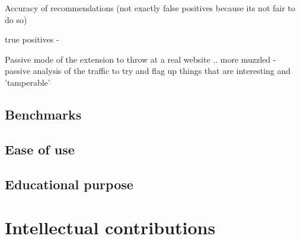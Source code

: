 Accuracy of recommendations (not exactly false positives because its not fair to do so)

true positives - 


Passive mode of the extension to throw at a real website .. more muzzled - passive analysis of the traffic to try and flag up things that are interesting and 'tamperable' 
\subsection{Benchmarks}

\subsection{Ease of use}

\subsection{Educational purpose}

\section{Intellectual contributions}
